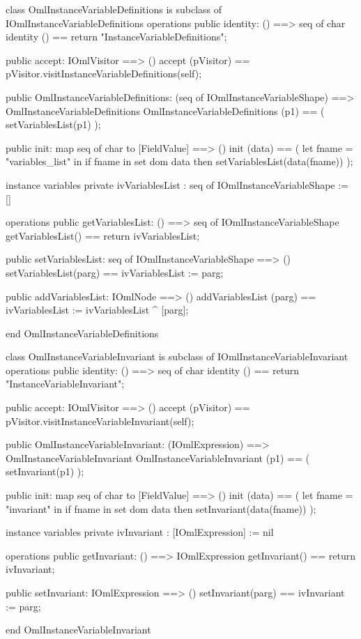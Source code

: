 \begin{vdm_al}
class OmlInstanceVariableDefinitions is subclass of IOmlInstanceVariableDefinitions
operations
  public identity: () ==> seq of char
  identity () == return "InstanceVariableDefinitions";

  public accept: IOmlVisitor ==> ()
  accept (pVisitor) == pVisitor.visitInstanceVariableDefinitions(self);

  public OmlInstanceVariableDefinitions:
      (seq of IOmlInstanceVariableShape) ==> OmlInstanceVariableDefinitions
  OmlInstanceVariableDefinitions (p1) == 
   ( setVariablesList(p1) );

  public init: map seq of char to [FieldValue] ==> ()
  init (data) ==
    ( let fname = "variables_list" in
        if fname in set dom data
        then setVariablesList(data(fname)) );

instance variables
  private ivVariablesList : seq of IOmlInstanceVariableShape := []

operations
  public getVariablesList: () ==> seq of IOmlInstanceVariableShape
  getVariablesList() == return ivVariablesList;

  public setVariablesList: seq of IOmlInstanceVariableShape ==> ()
  setVariablesList(parg) == ivVariablesList := parg;

  public addVariablesList: IOmlNode ==> ()
  addVariablesList (parg) == ivVariablesList := ivVariablesList ^ [parg];

end OmlInstanceVariableDefinitions
\end{vdm_al}

\begin{vdm_al}
class OmlInstanceVariableInvariant is subclass of IOmlInstanceVariableInvariant
operations
  public identity: () ==> seq of char
  identity () == return "InstanceVariableInvariant";

  public accept: IOmlVisitor ==> ()
  accept (pVisitor) == pVisitor.visitInstanceVariableInvariant(self);

  public OmlInstanceVariableInvariant:
      (IOmlExpression) ==> OmlInstanceVariableInvariant
  OmlInstanceVariableInvariant (p1) == 
   ( setInvariant(p1) );

  public init: map seq of char to [FieldValue] ==> ()
  init (data) ==
    ( let fname = "invariant" in
        if fname in set dom data
        then setInvariant(data(fname)) );

instance variables
  private ivInvariant : [IOmlExpression] := nil

operations
  public getInvariant: () ==> IOmlExpression
  getInvariant() == return ivInvariant;

  public setInvariant: IOmlExpression ==> ()
  setInvariant(parg) == ivInvariant := parg;

end OmlInstanceVariableInvariant
\end{vdm_al}

